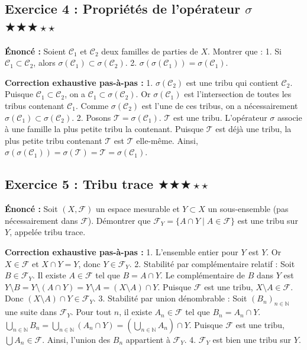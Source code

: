 \documentclass[11pt,a4paper]{article}
\begin{document}
\subsection*{Exercice 4 : Propriétés de l'opérateur $\sigma$ \quad $\bigstar\bigstar\bigstar\star\star$}


\textbf{Énoncé :}
Soient $\mathcal{C}_1$ et $\mathcal{C}_2$ deux familles de parties de $X$. Montrer que :
1. Si $\mathcal{C}_1 \subset \mathcal{C}_2$, alors $\sigma(\mathcal{C}_1) \subset \sigma(\mathcal{C}_2)$.
2. $\sigma(\sigma(\mathcal{C}_1)) = \sigma(\mathcal{C}_1)$.

\textbf{Correction exhaustive pas-à-pas :}
1. $\sigma(\mathcal{C}_2)$ est une tribu qui contient $\mathcal{C}_2$. Puisque $\mathcal{C}_1 \subset \mathcal{C}_2$, on a $\mathcal{C}_1 \subset \sigma(\mathcal{C}_2)$.
   Or $\sigma(\mathcal{C}_1)$ est l'intersection de toutes les tribus contenant $\mathcal{C}_1$. Comme $\sigma(\mathcal{C}_2)$ est l'une de ces tribus, on a nécessairement $\sigma(\mathcal{C}_1) \subset \sigma(\mathcal{C}_2)$.
2. Posons $\mathcal{T} = \sigma(\mathcal{C}_1)$. $\mathcal{T}$ est une tribu. L'opérateur $\sigma$ associe à une famille la plus petite tribu la contenant. Puisque $\mathcal{T}$ est déjà une tribu, la plus petite tribu contenant $\mathcal{T}$ est $\mathcal{T}$ elle-même.
   Ainsi, $\sigma(\sigma(\mathcal{C}_1)) = \sigma(\mathcal{T}) = \mathcal{T} = \sigma(\mathcal{C}_1)$.



\subsection*{Exercice 5 : Tribu trace \quad $\bigstar\bigstar\bigstar\star\star$}


\textbf{Énoncé :}
Soit $(X, \mathcal{F})$ un espace mesurable et $Y \subset X$ un sous-ensemble (pas nécessairement dans $\mathcal{F}$). Démontrer que $\mathcal{F}_Y = \{A \cap Y \mid A \in \mathcal{F}\}$ est une tribu sur $Y$, appelée tribu trace.

\textbf{Correction exhaustive pas-à-pas :}
1. L'ensemble entier pour $Y$ est $Y$. Or $X \in \mathcal{F}$ et $X \cap Y = Y$, donc $Y \in \mathcal{F}_Y$.
2. Stabilité par complémentaire relatif : Soit $B \in \mathcal{F}_Y$. Il existe $A \in \mathcal{F}$ tel que $B = A \cap Y$.
   Le complémentaire de $B$ dans $Y$ est $Y \setminus B = Y \setminus (A \cap Y) = Y \setminus A = (X \setminus A) \cap Y$.
   Puisque $\mathcal{F}$ est une tribu, $X \setminus A \in \mathcal{F}$. Donc $(X \setminus A) \cap Y \in \mathcal{F}_Y$.
3. Stabilité par union dénombrable : Soit $(B_n)_{n \in \mathbb{N}}$ une suite dans $\mathcal{F}_Y$. Pour tout $n$, il existe $A_n \in \mathcal{F}$ tel que $B_n = A_n \cap Y$.
   $\bigcup_{n \in \mathbb{N}} B_n = \bigcup_{n \in \mathbb{N}} (A_n \cap Y) = \left( \bigcup_{n \in \mathbb{N}} A_n \right) \cap Y$.
   Puisque $\mathcal{F}$ est une tribu, $\bigcup A_n \in \mathcal{F}$. Ainsi, l'union des $B_n$ appartient à $\mathcal{F}_Y$.
4. $\mathcal{F}_Y$ est bien une tribu sur $Y$.
\end{document}
